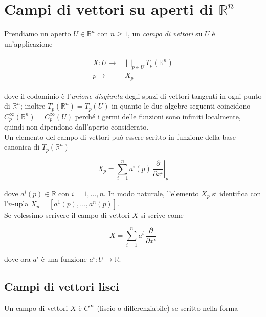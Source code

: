 \section{Campi di vettori su aperti di $ \mathbb{R}^{n} $}

Prendiamo un aperto $ U \in \mathbb{R}^{n} $ con $ n \geqslant 1 $, un \textit{campo di vettori} su $ U $ è un'applicazione

\begin{align}
	\begin{split}
		X : U \to& \, \bigsqcup_{p \in U} T_{p}(\mathbb{R}^{n})\\
		p \mapsto& \, X_{p}
	\end{split}
\end{align}

dove il codominio è l'\textit{unione disgiunta} degli spazi di vettori tangenti in ogni punto di $ \mathbb{R}^{n} $; inoltre $ T_{p}(\mathbb{R}^{n}) = T_{p}(U) $ in quanto le due algebre seguenti coincidono $ C_{p}^{\infty}(\mathbb{R}^{n}) = C_{p}^{\infty}(U) $ perché i germi delle funzioni sono infiniti localmente, quindi non dipendono dall'aperto considerato.\\
Un elemento del campo di vettori può essere scritto in funzione della base canonica di $ T_{p}(\mathbb{R}^{n}) $

\begin{equation}
	X_{p} = \sum_{i=1}^{n} a^{i}(p) \, \left. \dfrac{\partial}{\partial x^{i}} \right|_{p}
\end{equation}

dove $ a^{i}(p) \in \mathbb{R} $ con $ i=1,\dots,n $. In modo naturale, l'elemento $ X_{p} $ si identifica con l'$ n $-upla $ X_{p} = [a^{1}(p),\dots,a^{n}(p)] $.\\
Se volessimo scrivere il campo di vettori $ X $ si scrive come

\begin{equation}
	X = \sum_{i=1}^{n} a^{i} \, \dfrac{\partial}{\partial x^{i}}
\end{equation}

dove ora $ a^{i} $ è una funzione $ a^{i} : U \to \mathbb{R} $.

\subsection{Campi di vettori lisci}

Un campo di vettori $ X $ è $ C^{\infty} $ (liscio o differenziabile) se scritto nella forma

